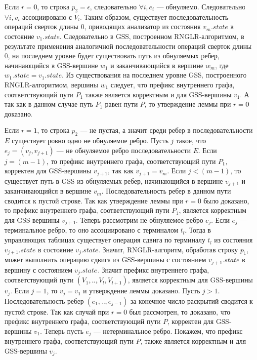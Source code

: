 Если $r = 0$, то строка $p_{2} = \epsilon$, следовательно $\forall i, e_{i}$ --- обнуляемо. Следовательно $\forall i, v_{i}$ ассоциировано с $V_{l}$. Таким образом, существует последовательность операций сверток длины 0, приводящих анализатор из состояния $v_{m}.state$ в состояние $v_{1}.state$. Следовательно в GSS, построенном RNGLR-алгоритмом, в результате применения аналогичной последовательности операций сверток длины 0, на последнем уровне будет существовать путь из обнуляемых ребер, начинающийся в GSS-вершине $w_{1}$ и заканчивающийся в вершине $w_{m}$, где $w_{1}.state = v_{1}.state$. Из существования на последнем уровне GSS, построенного RNGLR-алгоритмом, вершины $w_{1}$ следует, что префикс внутреннего графа, соответствующий пути $P_{1}$ также является корректным и для GSS-вершины $v_{1}$. А так как в данном случае путь $P_{1}$ равен пути $P$, то утверждение леммы при $r = 0$ доказано.

Если $r = 1$, то строка $p_{2}$ --- не пустая, а значит среди ребер в последовательности $E$ существует ровно одно не обнуляемое ребро. Пусть $j$ такое, что $e_{j} = (v_{j}, v_{j+1})$ --- не обнуляемое ребро последовательности $E$. Если $j = (m - 1)$, то префикс внутреннего графа, соответствующий пути $P_{1}$, корректен для GSS-вершины $v_{j+1}$, так как $v_{j+1} = v_{m}$. Если $j < (m - 1)$, то существует путь в GSS из обнуляемых ребер, начинающийся в вершине $v_{j+1}$ и заканчивающийся в вершине $v_{m}$. Последовательность ребер в данном пути сводится к пустой строке. Так как утверждение леммы при $r = 0$ было доказано, то префикс внутреннего графа, соответствующий пути $P_{1}$, является корректным для GSS-вершины $v_{j+1}$. Теперь рассмотрим не обнуляемое ребро $e_{j}$. Если $e_{j}$ --- терминальное ребро, то оно ассоциировано с терминалом $t_{l}$. Тогда в управляющих таблицах существует операция сдвига по терминалу $t_{l}$ из состояния $v_{j+1}.state$ в состояние $v_{j}.state$. Значит, RNGLR-алгоритм, обработав строку $p_{1}$, может выполнить операцию сдвига из GSS-вершины с состоянием $v_{j+1}.state$ в вершину с состоянием $v_{j}.state$. Значит префикс внутреннего графа, соответствующий пути $(V_{1},..,V_{l},V_{l+1})$, является корректным для GSS-вершины $v_{j}$. Если $j = 1$, то $v_{j} = v_{1}$ и утверждение леммы доказано. Пусть $j > 1$. Последовательность ребер $(e_{1},..,e_{j-1})$ за конечное число раскрытий сводится к пустой строке. Так как случай при $r = 0$ был рассмотрен, то доказано, что префикс внутреннего графа, соответствующий пути $P$, корректен для GSS-вершины $v_{1}$. Теперь пусть $e_{j}$ --- нетерминальное ребро. Покажем, что префикс внутреннего графа, соответствующий пути $P$, также является корректным и для GSS-вершины $v_{j}$. 

